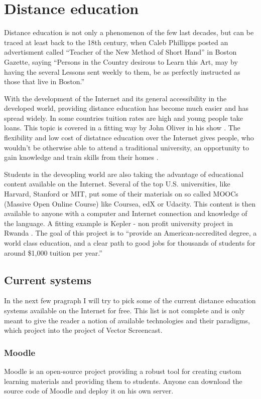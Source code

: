 \chapter{Distance education}

Distance education is not only a phenomenon of the few last decades, but can be traced at least back to the 18th century, when Caleb Phillipps posted an advertisment called ``Teacher of the New Method of Short Hand'' in Boston Gazette, saying ``Persons in the Country desirous to Learn this Art, may by having the several Lessons sent weekly to them, be as perfectly instructed as those that live in Boston.'' \cite{1}

With the development of the Internet and its general accessibility in the developed world, providing distance education has become much easier and has spread widely. In some countries tuition rates are high and young people take loans. This topic is covered in a fitting way by John Oliver in his show \cite{2}. The flexibility and low cost of distatnce education over the Internet gives people, who wouldn't be otherwise able to attend a traditional university, an opportunity to gain knowledge and train skills from their homes \cite{3}.

Students in the deveopling world are also taking the advantage of educational content available on the Internet. Several of the top U.S. universities, like Harvard, Stanford or MIT, put some of their materials on so called MOOCs (Massive Open Online Course) like Coursea, edX or Udacity. This content is then available to anyone with a computer and Internet connection and knowledge of the language. A fitting example is Kepler - non profit university project in Rwanda \cite{5}. The goal of this project is to ``provide an American-accredited degree, a world class education, and a clear path to good jobs for thousands of students for around \$1,000 tuition per year.'' \cite{6}

\section{Current systems}
In the next few pragraph I will try to pick some of the current distance education systems available on the Internet for free. This list is not complete and is only meant to give the reader a notion of available technologies and their paradigms, which project into the project of Vector Screencast.

\subsection{Moodle}
Moodle \cite{7} is an open-source project providing a robust tool for creating custom learning materials and providing them to students. Anyone can download the source code of Moodle and deploy it on his own server.

